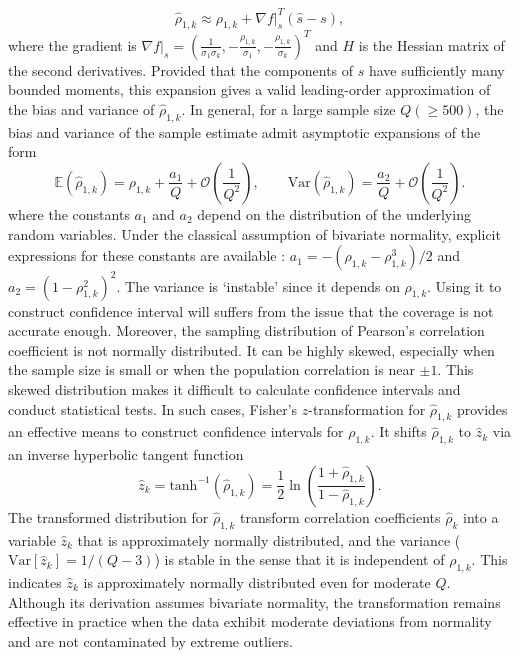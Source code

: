 %
\begin{equation}
\label{eq:Correlated_Coeff_approx}
  \widehat\rho_{1,k} \approx \rho_{1,k} + \nabla f |_{s}^T \left(\widehat s-s\right), 
\end{equation}
%
where the gradient is $\nabla f|_{s} = (\frac{1}{\sigma_1\sigma_k},-\frac{\rho_{1,k}}{\sigma_1},-\frac{\rho_{1,k}}{\sigma_k} )^T$ and $H$ is the Hessian matrix of the second derivatives. Provided that the components of $\widehat s$ have sufficiently many bounded moments, this expansion gives a valid leading-order approximation of the bias and variance of $\widehat \rho_{1,k}$. In general, for a large sample size $Q (\ge 500)$,  the bias and variance of the sample estimate admit asymptotic expansions of the form
%
\begin{equation*}
\label{eq:Expectation_var_rho}
    \mathbb{E}\left(\widehat \rho_{1,k}\right) =\rho_{1,k}+\frac{a_1}{Q} + \mathcal{O}\left(\frac 1 {Q^2}\right),\qquad \text{Var}\left(\widehat \rho_{1,k}\right)= \frac{a_2}{Q} + \mathcal{O}\left(\frac{1}{Q^2}\right).
\end{equation*}
%
where the constants $a_1$ and $a_2$ depend on the distribution of the underlying random variables. Under the classical assumption of bivariate normality, explicit expressions for these constants are available \cite{Fi:1915, Ha:2007, Ri:1932, So:1913}: $a_1 = -(\rho_{1,k} - \rho_{1,k}^3)/2$ and $a_2 = (1 - \rho_{1,k}^2)^2$. The variance is `instable' since it depends on $\rho_{1,k}$. Using it to construct confidence interval will suffers from the issue that the coverage is not accurate enough. Moreover, the sampling distribution of Pearson's correlation coefficient is not normally distributed. It can be highly skewed, especially when the sample size is small or when the population correlation is near $\pm 1$. This skewed distribution makes it difficult to calculate confidence intervals and conduct statistical tests. In such cases, Fisher's $z$-transformation \cite{Fi:1915, Fi:1921} for $\widehat \rho_{1,k}$ provides an effective means to construct confidence intervals for $\rho_{1,k}$. It shifts $\widehat\rho_{1,k}$ to $\widehat z_k$ via an inverse hyperbolic tangent function
%
\begin{equation}
\label{eq:Fisher_z}
    \widehat z_k  = \text{tanh}^{-1}\left(\widehat\rho_{1,k}\right) = \frac 1 2\ln \left(\frac{1+\widehat\rho_{1,k}}{1-\widehat\rho_{1,k}}\right).
\end{equation}
%
The transformed distribution for $\widehat \rho_{1,k}$ transform correlation coefficients $\widehat \rho_k$ into a variable $\widehat z_k$ that is approximately normally distributed, and the variance ($\text{Var}[\widehat z_k] = 1/(Q - 3)$) is stable in the sense that it is independent of $\rho_{1,k}$. This indicates $\widehat z_k$ is approximately normally distributed even for moderate $Q$. Although its derivation assumes bivariate normality, the transformation remains effective in practice when the data exhibit moderate deviations from normality and are not contaminated by extreme outliers. 

